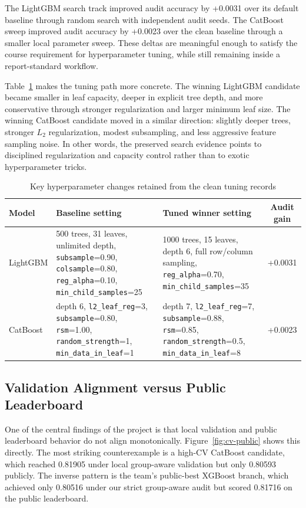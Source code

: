 \documentclass[conference]{IEEEtran}
\begin{document}
The LightGBM search track improved audit accuracy by +0.0031 over its default baseline through random search with independent audit seeds. The CatBoost sweep improved audit accuracy by +0.0023 over the clean baseline through a smaller local parameter sweep. These deltas are meaningful enough to satisfy the course requirement for hyperparameter tuning, while still remaining inside a report-standard workflow.

Table~\ref{tab:tuning-key-changes} makes the tuning path more concrete. The winning LightGBM candidate became smaller in leaf capacity, deeper in explicit tree depth, and more conservative through stronger regularization and larger minimum leaf size. The winning CatBoost candidate moved in a similar direction: slightly deeper trees, stronger $L_2$ regularization, modest subsampling, and less aggressive feature sampling noise. In other words, the preserved search evidence points to disciplined regularization and capacity control rather than to exotic hyperparameter tricks.

\begin{table}[!t]
\caption{Key hyperparameter changes retained from the clean tuning records}
\label{tab:tuning-key-changes}
\centering
\scriptsize
\begin{tabularx}{\textwidth}{>{\raggedright\arraybackslash}p{}X X c}
\toprule
Model & Baseline setting & Tuned winner setting & Audit gain \\
\midrule
LightGBM & 500 trees, 31 leaves, unlimited depth, \texttt{subsample}=0.90, \texttt{colsample}=0.80, \texttt{reg\_alpha}=0.10, \texttt{min\_child\_samples}=25 & 1000 trees, 15 leaves, depth 6, full row/column sampling, \texttt{reg\_alpha}=0.70, \texttt{min\_child\_samples}=35 & +0.0031 \\
CatBoost & depth 6, \texttt{l2\_leaf\_reg}=3, \texttt{subsample}=0.80, \texttt{rsm}=1.00, \texttt{random\_strength}=1, \texttt{min\_data\_in\_leaf}=1 & depth 7, \texttt{l2\_leaf\_reg}=7, \texttt{subsample}=0.88, \texttt{rsm}=0.85, \texttt{random\_strength}=0.5, \texttt{min\_data\_in\_leaf}=8 & +0.0023 \\
\bottomrule
\end{tabularx}
\end{table}

\subsection{Validation Alignment versus Public Leaderboard}
One of the central findings of the project is that local validation and public leaderboard behavior do not align monotonically. Figure~\ref{fig:cv-public} shows this directly. The most striking counterexample is a high-CV CatBoost candidate, which reached 0.81905 under local group-aware validation but only 0.80593 publicly. The inverse pattern is the team's public-best XGBoost branch, which achieved only 0.80516 under our strict group-aware audit but scored 0.81716 on the public leaderboard.
\end{document}
